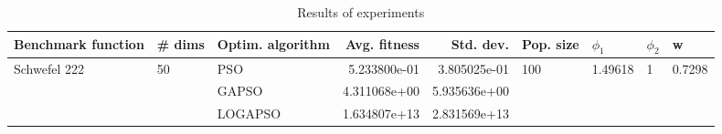 \begin{table}
\centering
\caption{Results of experiments}
\begin{tabular}{lllrrllll}
\toprule
           Benchmark function &             \# dims & Optim. algorithm &  Avg. fitness &    Std. dev. &            Pop. size &               $\phi_{1}$ &         $\phi_{2}$ &                       w \\
\midrule
\multirow{3}{*}{Schwefel 222} & \multirow{3}{*}{50} &              PSO &  5.233800e-01 & 3.805025e-01 & \multirow{3}{*}{100} & \multirow{3}{*}{1.49618} & \multirow{3}{*}{1} & \multirow{3}{*}{0.7298} \\
                              &                     &            GAPSO &  4.311068e+00 & 5.935636e+00 &                      &                          &                    &                         \\
                              &                     &          LOGAPSO &  1.634807e+13 & 2.831569e+13 &                      &                          &                    &                         \\
\bottomrule
\end{tabular}
\end{table}

